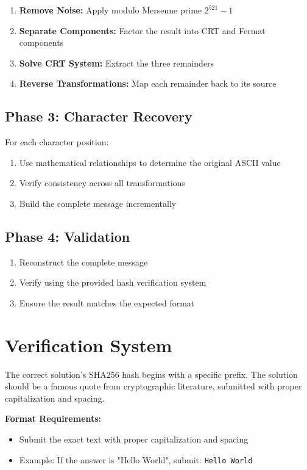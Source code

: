 \documentclass[11pt,a4paper]{article}
\begin{document}
\begin{enumerate}
    \item \textbf{Remove Noise:} Apply modulo Mersenne prime $2^{521} - 1$
    \item \textbf{Separate Components:} Factor the result into CRT and Fermat components
    \item \textbf{Solve CRT System:} Extract the three remainders
    \item \textbf{Reverse Transformations:} Map each remainder back to its source
\end{enumerate}

\subsection{Phase 3: Character Recovery}

For each character position:

\begin{enumerate}
    \item Use mathematical relationships to determine the original ASCII value
    \item Verify consistency across all transformations
    \item Build the complete message incrementally
\end{enumerate}

\subsection{Phase 4: Validation}

\begin{enumerate}
    \item Reconstruct the complete message
    \item Verify using the provided hash verification system
    \item Ensure the result matches the expected format
\end{enumerate}

\section{Verification System}

The correct solution's SHA256 hash begins with a specific prefix. The solution should be a famous quote from cryptographic literature, submitted with proper capitalization and spacing.

\textbf{Format Requirements:}
\begin{itemize}
    \item Submit the exact text with proper capitalization and spacing
    \item Example: If the answer is "Hello World", submit: \texttt{Hello World}
\end{itemize}
\end{document}
